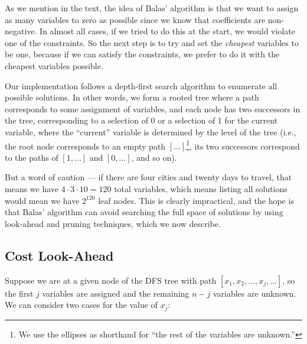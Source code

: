 \documentclass{article}
\begin{document}
As we mention in the text, the idea of Balas' algorithm is that we want to assign as many variables to zero as possible since we know that
coefficients are non-negative. In almost all cases, if we tried to do this at the start, we would violate one of the constraints. So the next step is
to try and set the \emph{cheapest} variables to be one, because if we can satisfy the constraints, we prefer to do it with the cheapest variables
possible.

Our implementation follows a depth-first search algorithm to enumerate all possible solutions. In other words, we form a rooted tree where a path
corresponds to some assignment of variables, and each node has two successors in the tree, corresponding to a selection of 0 or a selection of 1 for
the current variable, where the ``current'' variable is determined by the level of the tree (i.e., the root node corresponds to an empty path
$[\ldots]$\footnote{We use the ellipses as shorthand for ``the rest of the variables are unknown.''}, its two successors correspond to the paths of
$[1, \ldots]$ and $[0, \ldots]$, and so on).

But a word of caution --- if there are four cities and twenty days to travel, that means we have $4 \cdot 3 \cdot 10 = 120$ total variables, which
means listing all solutions would mean we have $2^{120}$ leaf nodes. This is clearly impractical, and the hope is that Balas' algorithm can avoid
searching the full space of solutions by using look-ahead and pruning techniques, which we now describe.

\subsection{Cost Look-Ahead}

Suppose we are at a given node of the DFS tree with path $[x_1, x_2, \ldots, x_j, \ldots]$, so the first $j$ variables are assigned and the remaining
$n-j$ variables are unknown. We can consider two cases for the value of $x_j$:
\end{document}
